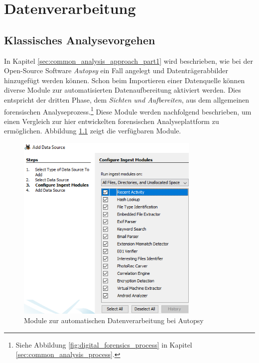 \chapter{Datenverarbeitung}
\label{ch:data_processing}

\section{Klassisches Analysevorgehen}
\label{sec:common_analysis_approach_part2}

In Kapitel \ref{sec:common_analysis_approach_part1} wird beschrieben, wie bei der Open-Source Software \textit{Autopsy} ein Fall angelegt und Datenträgerabbilder hinzugefügt werden können. Schon beim Importieren einer Datenquelle können diverse Module zur automatisierten Datenaufbereitung aktiviert werden. Dies entspricht der dritten Phase, dem \textit{Sichten und Aufbereiten}, aus dem allgemeinen forensischen Analyseprozess.\footnote{Siehe Abbildung \ref{fig:digital_forensics_process} in Kapitel \ref{sec:common_analysis_process}.} Diese Module werden nachfolgend beschrieben, um einen Vergleich zur hier entwickelten forensischen Analyseplattform zu ermöglichen.
Abbildung \ref{fig:autopsy_2_ingest_modules} zeigt die verfügbaren Module.

\begin{figure}[ht]
  \centering
  \includegraphics[width=0.78\textwidth]{./resource/autopsy_2_ingest_modules.png}
  \caption{Module zur automatischen Datenverarbeitung bei Autopsy}
  \label{fig:autopsy_2_ingest_modules}
\end{figure}

